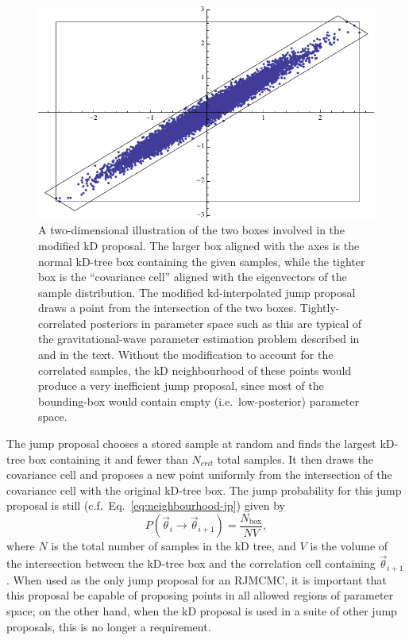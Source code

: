 \documentclass{rsos}
\newcommand{\vtheta}{\vec{\theta}}
\newcommand{\Nbox}{N_\mathrm{box}}
\newcommand{\ee}{\end{equation}}
\newcommand{\bel}[1]{\begin{equation}\label{#1}}
\begin{document}
\begin{figure}
  \includegraphics[width=0.8\columnwidth]{PCC}
  \caption{\label{fig:PCC} A two-dimensional illustration of the two
    boxes involved in the modified kD proposal.  The larger box
    aligned with the axes is the normal kD-tree box containing the
    given samples, while the tighter box is the ``covariance cell''
    aligned with the eigenvectors of the sample distribution.  The
    modified kd-interpolated jump proposal draws a point from the
    intersection of the two boxes. Tightly-correlated posteriors in
    parameter space such as this are typical of the gravitational-wave
    parameter estimation problem described in \cite{Veitch:2014} and
    in the text.  Without the modification to account for the
    correlated samples, the kD neighbourhood of these points would
    produce a very inefficient jump proposal, since most of the
    bounding-box would contain empty (i.e.\ low-posterior) parameter
    space.}
\end{figure}

The jump proposal chooses a stored sample at random and finds the largest kD-tree box containing it and fewer than $N_{crit}$ total samples. It then draws the covariance cell and proposes a new point uniformly from the intersection of the covariance cell with the original kD-tree box.
The jump probability for this jump proposal is still (c.f.\ Eq.\
\eqref{eq:neighbourhood-jp}) given by
%
\bel{modforward} P(\vtheta_i \rightarrow \vtheta_{i+1}) =
\frac{\Nbox}{N V} , \ee
%
where $N$ is the total number of samples in the kD tree, and $V$ is the
volume of the intersection between the kD-tree box and the correlation cell containing $\vtheta_{i+1}$. When used as the only jump proposal for an
RJMCMC, it is important that this proposal be capable of
proposing points in all allowed regions of parameter space; on the
other hand, when the kD proposal is used in a suite of other jump proposals, this is no longer a requirement.
\end{document}
